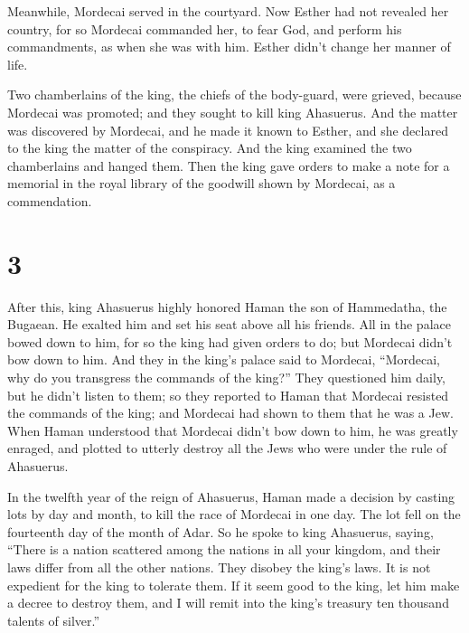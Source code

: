  Meanwhile, Mordecai served in the courtyard.
 Now Esther had not revealed her country, for so Mordecai
commanded her, to fear God, and perform his commandments, as when she
was with him. Esther didn't change her manner of life.

 Two chamberlains of the king, the chiefs of the
body-guard, were grieved, because Mordecai was promoted; and they sought
to kill king Ahasuerus.  And the matter was discovered by
Mordecai, and he made it known to Esther, and she declared to the king
the matter of the conspiracy.  And the king examined the
two chamberlains and hanged them. Then the king gave orders to make a
note for a memorial in the royal library of the goodwill shown by
Mordecai, as a commendation.

\hypertarget{section-2}{%
\section{3}\label{section-2}}

 After this, king Ahasuerus highly honored Haman the son
of Hammedatha, the Bugaean. He exalted him and set his seat above all
his friends.  All in the palace bowed down to him, for so
the king had given orders to do; but Mordecai didn't bow down to him.
 And they in the king's palace said to Mordecai,
``Mordecai, why do you transgress the commands of the king?''
 They questioned him daily, but he didn't listen to them;
so they reported to Haman that Mordecai resisted the commands of the
king; and Mordecai had shown to them that he was a Jew. 
When Haman understood that Mordecai didn't bow down to him, he was
greatly enraged,  and plotted to utterly destroy all the
Jews who were under the rule of Ahasuerus.

 In the twelfth year of the reign of Ahasuerus, Haman made
a decision by casting lots by day and month, to kill the race of
Mordecai in one day. The lot fell on the fourteenth day of the month of
Adar.  So he spoke to king Ahasuerus, saying, ``There is a
nation scattered among the nations in all your kingdom, and their laws
differ from all the other nations. They disobey the king's laws. It is
not expedient for the king to tolerate them.  If it seem
good to the king, let him make a decree to destroy them, and I will
remit into the king's treasury ten thousand talents of silver.''

